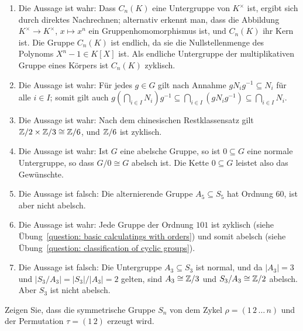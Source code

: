 \begin{solution}
  \begin{enumerate}
    \item
      Die Aussage ist wahr:
      Dass $C_n(K)$ eine Untergruppe von $K^\times$ ist, ergibt sich durch direktes Nachrechnen;
      alternativ erkennt man, dass die Abbildung $K^\times \to K^\times$, $x \mapsto x^n$ ein Gruppenhomomorphismus ist, und $C_n(K)$ ihr Kern ist.
      Die Gruppe $C_n(K)$ ist endlich, da sie die Nullstellenmenge des Polynoms $X^n - 1 \in K[X]$ ist.
      Als endliche Untergruppe der multiplikativen Gruppe eines Körpers ist $C_n(K)$ zyklisch.
    \item
      Die Aussage ist wahr:
      Für jedes $g \in G$ gilt nach Annahme $g N_i g^{-1} \subseteq N_i$ für alle $i \in I$;
      somit gilt auch $g \left( \bigcap_{i \in I} N_i \right) g^{-1} \subseteq \bigcap_{i \in I} (g N_i g^{-1}) \subseteq \bigcap_{i \in I} N_i$.
    \item
      Die Aussage ist wahr:
      Nach dem chinesischen Restklassensatz gilt $\mathbb{Z}/2 \times \mathbb{Z}/3 \cong \mathbb{Z}/6$, und $\mathbb{Z}/6$ ist zyklisch.
    \item
      Die Aussage ist wahr:
      Ist $G$ eine abelsche Gruppe, so ist $0 \subseteq G$ eine normale Untergruppe, so dass $G/0 \cong G$ abelsch ist.
      Die Kette $0 \subseteq G$ leistet also das Gewünschte.
    \item
      Die Aussage ist falsch:
      Die alternierende Gruppe $A_5 \subseteq S_5$ hat Ordnung $60$, ist aber nicht abelsch.
    \item
      Die Aussage ist wahr:
      Jede Gruppe der Ordnung $101$ ist zyklisch (siehe Übung~\ref{question: basic calculatings with orders}) und somit abelsch (siehe Übung~\ref{question: classification of cyclic groups}).
    \item
      Die Aussage ist falsch:
      Die Untergruppe $A_3 \subseteq S_3$ ist normal, und da $|A_3| = 3$ und $|S_3/A_3| = |S_3|/|A_3| = 2$ gelten, sind $A_3 \cong \mathbb{Z}/3$ und $S_3/A_3 \cong \mathbb{Z}/2$ abelsch.
      Aber $S_3$ ist nicht abelsch.
  \end{enumerate}
\end{solution}


\begin{question}
  Zeigen Sie, dass die symmetrische Gruppe $S_n$ von dem Zykel $\rho = (1 \, 2 \, \dotso \, n)$ und der Permutation $\tau = (1 \, 2)$ erzeugt wird.
\end{question}



